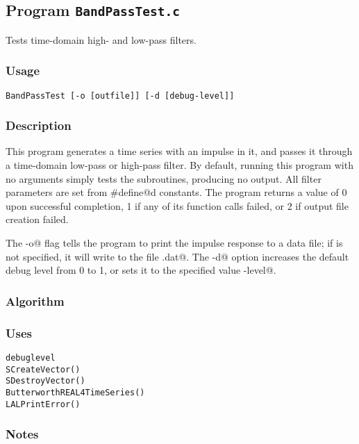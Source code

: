
\subsection{Program \texttt{BandPassTest.c}}

Tests time-domain high- and low-pass filters.

\subsubsection{Usage}
\begin{verbatim}
BandPassTest [-o [outfile]] [-d [debug-level]]
\end{verbatim}

\subsubsection{Description}

This program generates a time series with an impulse in it, and passes
it through a time-domain low-pass or high-pass filter.  By default,
running this program with no arguments simply tests the subroutines,
producing no output.  All filter parameters are set from
\verb@#define@d constants.  The program returns a value of 0 upon
successful completion, 1 if any of its function calls failed, or 2 if
output file creation failed.

The \verb@-o@ flag tells the program to print the impulse response to
a data file; if \verb@outfile@ is not specified, it will write to the
file \verb@out.dat@.  The \verb@-d@ option increases the default debug
level from 0 to 1, or sets it to the specified value
\verb@debug-level@.

\subsubsection{Algorithm}

\subsubsection{Uses}
\begin{verbatim}
debuglevel
SCreateVector()
SDestroyVector()
ButterworthREAL4TimeSeries()
LALPrintError()
\end{verbatim}

\subsubsection{Notes}

